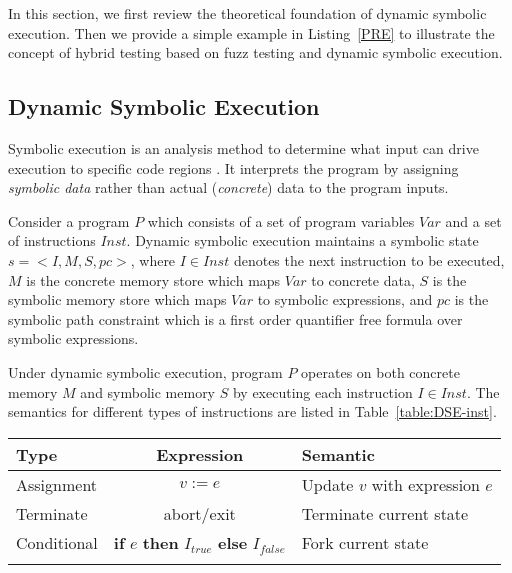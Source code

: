 
In this section, we first review the theoretical foundation of dynamic
symbolic execution. Then we provide a simple example in
Listing~\ref{PRE} to illustrate the concept of hybrid testing based on
fuzz testing and dynamic symbolic execution.

\subsection{Dynamic Symbolic Execution}

Symbolic execution is an analysis method to determine what input can
drive execution to specific code regions \cite{King:Symbex}. It
interprets the program by assigning \textit{symbolic data} rather than
actual (\textit{concrete}) data to the program inputs.

Consider a program $P$ which consists of a set of program variables
$Var$ and a set of instructions $Inst$. Dynamic symbolic execution
maintains a symbolic state $s=<I,M,S,pc>$, where $I\in Inst$ denotes
the next instruction to be executed, $M$ is the concrete memory store
which maps $Var$ to concrete data, $S$ is the symbolic memory store
which maps $Var$ to symbolic expressions, and $pc$ is the symbolic path
constraint which is a first order quantifier free formula over symbolic
expressions.

Under dynamic symbolic execution, program $P$ operates on both concrete
memory $M$ and symbolic memory $S$ by executing each instruction $I\in
Inst$. The semantics for different types of instructions are listed in
Table~\ref{table:DSE-inst}.

\begin{table}[!b]
{\begin{tabular*}{20pc}{@{\extracolsep{\fill}}lcl@{}}\toprule
Type  & Expression & Semantic\\
\midrule
Assignment   &  $v:=e$ & Update $v$ with expression $e$\\
Terminate    &  abort/exit & Terminate current state \\
Conditional  &  \textbf{if} $e$ \textbf{then} $I_{true}$ \textbf{else} $I_{false}$ & Fork current state\\
\botrule
\end{tabular*}}{}
\end{table}


